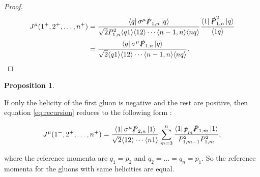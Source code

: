 \documentclass{article}
\theoremstyle{definition}
\newtheorem{prop}[theorem]{Proposition}
\numberwithin{equation}{section}
\begin{document}
\begin{proof}
    \begin{align*}
        J^{\mu}(1^{+}, 2^{+}, \dots , n^{+}) &= \frac{ \bra{q} \sigma^{\mu} \slashed{P}_{1,n} \ket{q} }{ \sqrt{2} P_{1,n}^2 \langle q1 \rangle \langle 12 \rangle \cdots \langle n-1,n \rangle \langle nq \rangle } \frac{\bra{1} \slashed{P}_{1,n}^2 \ket{q} }{\langle 1q \rangle} \\
        &= \frac{ \bra{q} \sigma^{\mu} \slashed{P}_{1,n} \ket{q} }{ \sqrt{2} \langle q1 \rangle \langle 12 \rangle \cdots \langle n-1,n \rangle \langle nq \rangle }.
    \end{align*}

\end{proof}

\begin{prop}
\label{prop:Jmppp}

    If only the helicity of the first gluon is negative and the rest are positive, then equation \eqref{eq:recursion} reduces to the following form \cite{dixon1996}:

    \begin{align}
        J^{\mu}(1^{-}, 2^{+}, \dots , n^{+}) = \frac{ \bra{1} \sigma^{\mu} \slashed{P}_{2,n} \ket{1} }{ \sqrt{2} \langle 12 \rangle \cdots \langle n1 \rangle } \sum_{m=3}^{n} \frac{ \bra{1} \slashed{p}_m \slashed{P}_{1,m} \ket{1} }{ P_{1,m-1}^2 P_{1,m}^2 } \label{eq:Jmppp},
    \end{align}

    where the reference momenta are $q_1 = p_2$ and $q_2 = \dots = q_n = p_1$. So the reference momenta for the gluons with same helicities are equal.

\end{prop}
\end{document}
